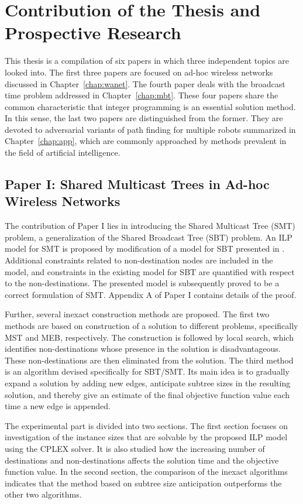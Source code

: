 \chapter{Contribution of the Thesis and Prospective Research}

This thesis is a compilation of six papers in which three independent topics are looked into.
The first three papers are focused on ad-hoc wireless networks discussed in Chapter~\ref{chap:wanet}.
The fourth paper deals with the broadcast time problem addressed in Chapter~\ref{chap:mbt}.
These four papers share the common characteristic that integer programming is an essential solution method.
In this sense, the last two papers are distinguished from the former.
They are devoted to adversarial variants of path finding for multiple robots summarized in Chapter~\ref{chap:app}, 
which are commonly approached by methods prevalent in the field of artificial intelligence.
%
%
\section{Paper I:  Shared Multicast Trees in Ad-hoc Wireless Networks}

The contribution of Paper I lies in introducing the Shared Multicast Tree (SMT) problem, a generalization of the Shared Broadcast Tree (SBT) problem.
An ILP model for SMT is proposed by modification of a model for SBT presented in \cite{yuan12}.
Additional constraints related to non-destination nodes are included in the model, and constraints in the existing model for SBT are quantified with respect to the non-destinations.
The presented model is subsequently proved to be a correct formulation of SMT.
Appendix A of Paper I contains details of the proof.

Further, several inexact construction methods are proposed.
The first two methods are based on construction of a solution to different problems, specifically MST and MEB, respectively. 
The construction is followed by local search, which identifies non-destinations whose presence in the solution is disadvantageous.
These non-destinations are then eliminated from the solution.
The third method is an algorithm devised specifically for SBT/SMT.
Its main idea is to gradually expand a solution by adding new edges, anticipate subtree sizes in the resulting solution, 
and thereby give an estimate of the final objective function value each time a new edge is appended. 

The experimental part is divided into two sections.
The first section focuses on investigation of the instance sizes that are solvable by the proposed ILP model using the CPLEX solver.
It is also studied how the increasing number of destinations and non-destinations affects the solution time and the objective function value.
In the second section, the comparison of the inexact algorithms indicates that the method based on subtree size anticipation outperforms the other two algorithms.

